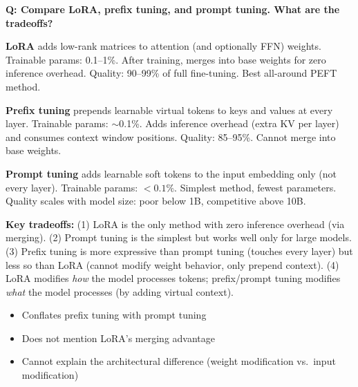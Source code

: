 \begin{interviewq}
\end{interviewq}

\bigskip

\begin{interviewq}
\textbf{Q: Compare LoRA, prefix tuning, and prompt tuning. What are the tradeoffs?}

 \quad {} \quad \badgefreq{\freqmed}

\stronganswer
\textbf{LoRA} adds low-rank matrices to attention (and optionally FFN) weights.
Trainable params: 0.1--1\%.  After training, merges into base weights for zero
inference overhead.  Quality: 90--99\% of full fine-tuning.  Best all-around
PEFT method.

\textbf{Prefix tuning} prepends learnable virtual tokens to keys and values at
every layer.  Trainable params: $\sim$0.1\%.  Adds inference overhead (extra KV
per layer) and consumes context window positions.  Quality: 85--95\%.  Cannot
merge into base weights.

\textbf{Prompt tuning} adds learnable soft tokens to the input embedding only (not
every layer).  Trainable params: $< 0.1\%$.  Simplest method, fewest parameters.
Quality scales with model size: poor below 1B, competitive above 10B.

\textbf{Key tradeoffs:} (1) LoRA is the only method with zero inference overhead
(via merging). (2) Prompt tuning is the simplest but works well only for large
models. (3) Prefix tuning is more expressive than prompt tuning (touches every
layer) but less so than LoRA (cannot modify weight behavior, only prepend context).
(4) LoRA modifies \emph{how} the model processes tokens; prefix/prompt tuning
modifies \emph{what} the model processes (by adding virtual context).

\redflags
\begin{itemize}
    \item Conflates prefix tuning with prompt tuning
    \item Does not mention LoRA's merging advantage
    \item Cannot explain the architectural difference (weight modification vs.\ input modification)
\end{itemize}



\end{interviewq}
